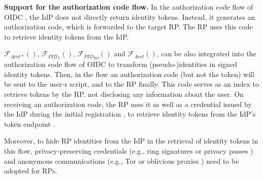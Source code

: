 



\noindent \textbf{Support for the authorization code flow.} In the authorization code flow of OIDC \cite{OpenIDConnect}, the IdP does not directly return identity tokens.
Instead, it generates an authorization code, which is forwarded to the target RP.
The RP uses this code to retrieve identity tokens from the IdP.

$\mathcal{F}_{Acct\ast}()$, $\mathcal{F}_{PID_{U}}()$, $\mathcal{F}_{PID_{RP}}()$ and $\mathcal{F}_{Acct}()$, can be also integrated into the authorization code flow of OIDC to transform (pseudo-)identities in signed identity tokens.
Then, in the flow an authorization code (but not the token) will be sent to the user-r script, and to the RP finally.
This code serves as an index to retrieve tokens by the RP, not disclosing any information about the user.
On receiving an authorization code, the RP uses it as well as a credential issued by the IdP during the initial registration \cite{OpenIDConnect}, to retrieve identity tokens from the IdP's token endpoint \cite{rfc6749}.

Moreover, to hide RP identities from the IdP in the retrieval of identity tokens in this flow,
 privacy-preserving credentials
    (e.g., ring signatures \cite{ring-sig} or privacy passes \cite{privacypass,trusttoken})
 and anonymous communications (e.g., Tor \cite{tor} or oblivious proxies \cite{ohttp-rfc}) need to be adopted for RPs.



